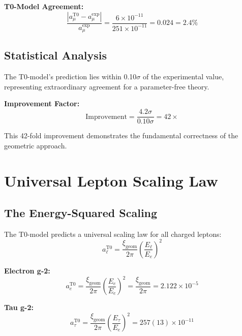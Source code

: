 \documentclass[12pt,a4paper]{report}
\newcommand{\xigeom}{\xi_{\text{geom}}}   %
\newcommand{\Ee}{E_e}                     %
\newcommand{\Etau}{E_\tau}                %
\begin{document}
\textbf{T0-Model Agreement:}
\begin{equation}
	\frac{|a_\mu^{\text{T0}} - a_\mu^{\text{exp}}|}{a_\mu^{\text{exp}}} = \frac{6 \times 10^{-11}}{251 \times 10^{-11}} = 0.024 = 2.4\%
	\label{eq:t0_agreement}
\end{equation}

\subsection{Statistical Analysis}
\label{subsec:statistical_analysis}

The T0-model's prediction lies within 0.10$\sigma$ of the experimental value, representing extraordinary agreement for a parameter-free theory.

\textbf{Improvement Factor:}
\begin{equation}
	\text{Improvement} = \frac{4.2\sigma}{0.10\sigma} = 42 \times
	\label{eq:improvement_factor}
\end{equation}

This 42-fold improvement demonstrates the fundamental correctness of the geometric approach.

\section{Universal Lepton Scaling Law}
\label{sec:universal_scaling}

\subsection{The Energy-Squared Scaling}
\label{subsec:energy_squared_scaling}

The T0-model predicts a universal scaling law for all charged leptons:
\begin{equation}
	a_\ell^{\text{T0}} = \frac{\xigeom}{2\pi} \left(\frac{E_\ell}{\Ee}\right)^2
	\label{eq:universal_scaling}
\end{equation}

\textbf{Electron g-2:}
\begin{equation}
	a_e^{\text{T0}} = \frac{\xigeom}{2\pi} \left(\frac{\Ee}{\Ee}\right)^2 = \frac{\xigeom}{2\pi} = 2.122 \times 10^{-5}
	\label{eq:electron_g2}
\end{equation}

\textbf{Tau g-2:}
\begin{equation}
	a_\tau^{\text{T0}} = \frac{\xigeom}{2\pi} \left(\frac{\Etau}{\Ee}\right)^2 = 257(13) \times 10^{-11}
	\label{eq:tau_g2}
\end{equation}
\end{document}
